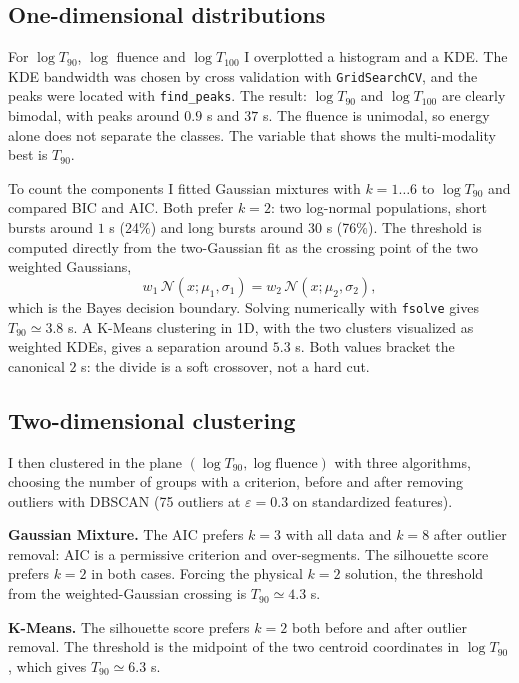 \documentclass[11pt]{article}
\begin{document}
\subsection*{One-dimensional distributions}

For $\log T_{90}$, $\log$ fluence and $\log T_{100}$ I overplotted a histogram and a KDE. The KDE bandwidth was chosen by cross validation with \texttt{GridSearchCV}, and the peaks were located with \texttt{find\_peaks}. The result: $\log T_{90}$ and $\log T_{100}$ are clearly bimodal, with peaks around $0.9$ s and $37$ s. The fluence is unimodal, so energy alone does not separate the classes. The variable that shows the multi-modality best is $T_{90}$.

To count the components I fitted Gaussian mixtures with $k=1\ldots6$ to $\log T_{90}$ and compared BIC and AIC. Both prefer $k=2$: two log-normal populations, short bursts around $1$ s (24\%) and long bursts around $30$ s (76\%). The threshold is computed directly from the two-Gaussian fit as the crossing point of the two weighted Gaussians,
\[
w_1\,\mathcal N(x;\mu_1,\sigma_1) = w_2\,\mathcal N(x;\mu_2,\sigma_2),
\]
which is the Bayes decision boundary. Solving numerically with \texttt{fsolve} gives $T_{90}\simeq 3.8$ s. A K-Means clustering in 1D, with the two clusters visualized as weighted KDEs, gives a separation around $5.3$ s. Both values bracket the canonical $2$ s: the divide is a soft crossover, not a hard cut.

\subsection*{Two-dimensional clustering}

I then clustered in the plane $(\log T_{90}, \log \mathrm{fluence})$ with three algorithms, choosing the number of groups with a criterion, before and after removing outliers with DBSCAN (75 outliers at $\varepsilon=0.3$ on standardized features).

\textbf{Gaussian Mixture.} The AIC prefers $k=3$ with all data and $k=8$ after outlier removal: AIC is a permissive criterion and over-segments. The silhouette score prefers $k=2$ in both cases. Forcing the physical $k=2$ solution, the threshold from the weighted-Gaussian crossing is $T_{90}\simeq 4.3$ s.

\textbf{K-Means.} The silhouette score prefers $k=2$ both before and after outlier removal. The threshold is the midpoint of the two centroid coordinates in $\log T_{90}$, which gives $T_{90}\simeq 6.3$ s.
\end{document}
